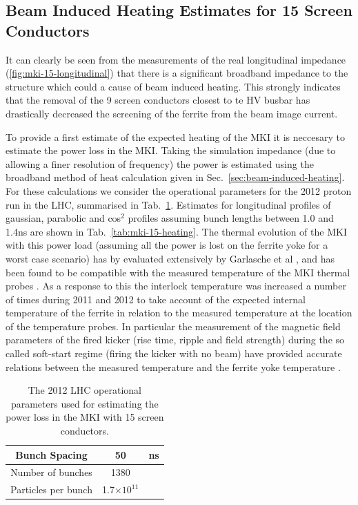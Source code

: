\subsection{Beam Induced Heating Estimates for 15 Screen Conductors}

It can clearly be seen from the measurements of the real longitudinal impedance (\ref{fig:mki-15-longitudinal}) that there is a significant broadband impedance to the structure which could a cause of beam induced heating. This strongly indicates that the removal of the 9 screen conductors closest to te HV busbar has drastically decreased the screening of the ferrite from the beam image current.

To provide a first estimate of the expected heating of the MKI it is neccesary to estimate the power loss in the MKI. Taking the simulation impedance (due to allowing a finer resolution of frequency) the power is estimated using the broadband method of heat calculation given in Sec.~\ref{sec:beam-induced-heating}. For these calculations we consider the operational parameters for the 2012 proton run in the LHC, summarised in Tab.~\ref{tab:mki-beam-parameters}. Estimates for longitudinal profiles of gaussian, parabolic and cos$^{2}$ profiles assuming bunch lengths between 1.0 and 1.4ns are shown in Tab.~\ref{tab:mki-15-heating}. The thermal evolution of the MKI with this power load (assuming all the power is lost on the ferrite yoke for a worst case scenario) has by evaluated extensively by Garlasche et al \cite{Garlasche:2dHeat}, and has been found to be compatible with the measured temperature of the MKI thermal probes \cite{Barnes:mkiHeating}. As a response to this the interlock temperature was increased a number of times during 2011 and 2012 to take account of the expected internal temperature of the ferrite in relation to the measured temperature at the location of the temperature probes. In particular the measurement of the magnetic field parameters of the fired kicker (rise time, ripple and field strength) during the so called soft-start regime (firing the kicker with no beam) have provided accurate relations between the measured temperature and the ferrite yoke temperature \cite{Barnes:mkiHeating}.

\begin{table}
\label{tab:mki-beam-parameters}
\caption{The 2012 LHC operational parameters used for estimating the power loss in the MKI with 15 screen conductors.}
\begin{center}
\begin{tabular}{c | c | c}
Bunch Spacing & 50 & ns \\ \hline
Number of bunches & 1380 & \\ \hline
Particles per bunch & 1.7$\times 10^{11}$ & \\
\end{tabular}
\end{center}
\end{table}

